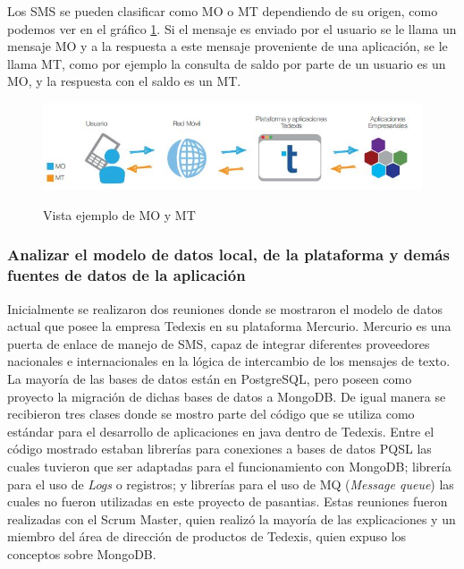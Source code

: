 \indent Los SMS se pueden clasificar como MO o MT dependiendo de su origen, como podemos ver en el gráfico \ref{fig:tdx1}. Si el mensaje es enviado por el usuario se le llama un mensaje MO y a la respuesta a este mensaje proveniente de una aplicación, se le llama MT, como por ejemplo la consulta de saldo por parte de un usuario es un MO, y la respuesta con el saldo es un MT.

\begin{figure}[ht]
  \centering
  \includegraphics[scale=0.65,type=png,ext=.jpeg,read=.jpeg]{imagenes/tdx} \\
  \caption{Vista ejemplo de MO y MT}
  \label{fig:tdx1}
\end{figure}

\subsubsection{Analizar el modelo de datos local, de la plataforma y demás fuentes de datos de la aplicación}
\indent Inicialmente se realizaron dos reuniones donde se mostraron el modelo de datos actual que posee la empresa Tedexis en su plataforma Mercurio. Mercurio es una puerta de enlace de manejo de SMS, capaz de integrar diferentes proveedores nacionales e internacionales en la lógica de intercambio de los mensajes de texto. La mayoría de las bases de datos están en PostgreSQL, pero poseen como proyecto la migración de dichas bases de datos a MongoDB.
\newline
\newline
\indent De igual manera se recibieron tres clases donde se mostro parte del código que se utiliza como estándar para el desarrollo de aplicaciones en java dentro de Tedexis. Entre el código mostrado estaban librerías para conexiones a bases de datos PQSL las cuales tuvieron que ser adaptadas para el funcionamiento con MongoDB; librería para el uso de \textit{Logs} o registros; y librerías para el uso de MQ (\textit{Message queue}) las cuales no fueron utilizadas en este proyecto de pasantias.
\newline
\newline
\indent Estas reuniones fueron realizadas con el Scrum Master, quien realizó la mayoría de las explicaciones y un miembro del área de dirección de productos de Tedexis, quien expuso los conceptos sobre MongoDB.

